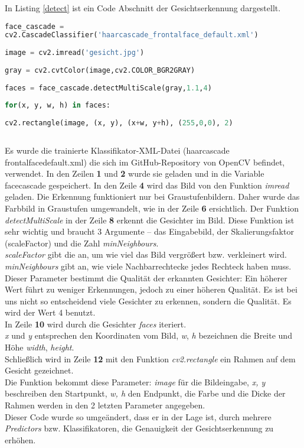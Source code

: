 	
	In Listing \ref{detect} ist ein Code Abschnitt der Gesichtserkennung
	dargestellt. \\
	
\begin{lstlisting}[language=Python, caption=Kern Code für
Gesichtsdetektion,label=detect]
face_cascade = 
cv2.CascadeClassifier('haarcascade_frontalface_default.xml')
	
image = cv2.imread('gesicht.jpg')
	
gray = cv2.cvtColor(image,cv2.COLOR_BGR2GRAY)
	
faces = face_cascade.detectMultiScale(gray,1.1,4)
	
for(x, y, w, h) in faces:
	
cv2.rectangle(image, (x, y), (x+w, y+h), (255,0,0), 2) 
	
\end{lstlisting}
	
	
	Es wurde die trainierte Klassifikator-XML-Datei (haarcascade\textunderscore
	frontalface\textunderscore default.xml) die sich im GitHub-Repository von OpenCV
	befindet, verwendet.
	In den Zeilen \textbf{1} und \textbf{2} wurde sie geladen und in die Variable
	face\textunderscore cascade gespeichert.
	In den Zeile \textbf{4} wird das Bild von den Funktion \emph{imread} geladen.
	Die Erkennung funktioniert nur bei Graustufenbildern. Daher wurde das Farbbild
	in Graustufen umgewandelt, wie in der Zeile \textbf{6} ersichtlich.
	Der Funktion \textit{ detectMultiScale } in der Zeile \textbf{8} erkennt die
	Gesichter im Bild. Diese Funktion ist sehr wichtig und braucht 3 Argumente – das
	Eingabebild, der Skalierungsfaktor (scaleFactor) und die Zahl
	\textit{minNeighbours}. 
	\\
	\textit{scaleFactor} gibt die an, um wie viel das Bild vergrößert bzw.
	verkleinert wird. \\
	\textit{minNeighbours} gibt an, wie viele Nachbarrechtecke jedes Rechteck haben
	muss. Dieser Parameter bestimmt die Qualität der erkannten Gesichter: Ein
	höherer Wert führt zu weniger Erkennungen, jedoch zu einer höheren Qualität.
	Es ist bei uns nicht so entscheidend viele Gesichter zu erkennen, sondern die
	Qualität. Es wird der Wert 4 benutzt.
	\\
	In Zeile \textbf{10} wird durch die Gesichter \textit{faces} iteriert. \\
	\textit{x} und \textit{y} entsprechen den Koordinaten vom Bild, \textit{w},
	\textit{h} bezeichnen die Breite und Höhe \textit{width}, \textit{height}.
	\\
	Schließlich wird in Zeile \textbf{12} mit den Funktion \textit{cv2.rectangle}
	ein Rahmen auf dem Gesicht gezeichnet. \\
	Die Funktion bekommt diese Parameter: \textit{image} für die Bildeingabe,
	\textit{x, y} beschreiben den Startpunkt, \textit{w, h} den Endpunkt, die Farbe
	und die Dicke der Rahmen werden in den 2 letzten Parameter angegeben.
	\\
	Dieser Code wurde so umgeändert, dass er in der Lage ist, durch mehrere
	\textit{Predictors} bzw. Klassifikatoren, die Genauigkeit der Gesichtserkennung
	zu erhöhen. \\
	

